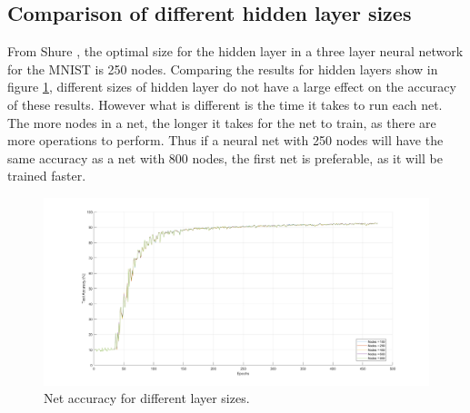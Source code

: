 \documentclass[12pt]{article}
\begin{document}
	\subsection{Comparison of different hidden layer sizes}
	
	From Shure \cite{matlabNNBeg}, the optimal size for the hidden layer in a three layer neural network for the MNIST is 250 nodes. Comparing the results for hidden layers show in figure \ref{fig:multiplelayers}, different sizes of hidden layer do not have a large effect on the accuracy of these results. However what is different is the time it takes to run each net. The more nodes in a net, the longer it takes for the net to train, as there are more operations to perform. Thus if a neural net with 250 nodes will have the same accuracy as a net with 800 nodes, the first net is preferable, as it will be trained faster.
	
	
	\begin{figure}
		\centering
		\includegraphics[width=0.7\linewidth]{multipleLayers}
		\caption{Net accuracy for different layer sizes.}
		\label{fig:multiplelayers}
	\end{figure}
	
	
\end{document}
